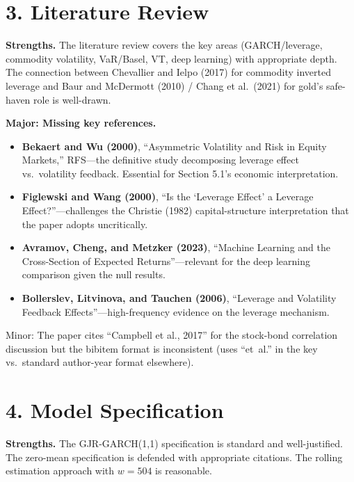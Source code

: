 \documentclass[12pt,a4paper]{article}
\begin{document}
\bigskip

\section*{3. Literature Review}

\textcolor{okgreen}{\textbf{Strengths.}} The literature review covers the key areas (GARCH/leverage, commodity volatility, VaR/Basel, VT, deep learning) with appropriate depth. The connection between Chevallier and Ielpo (2017) for commodity inverted leverage and Baur and McDermott (2010) / Chang et al.\ (2021) for gold's safe-haven role is well-drawn.

\textcolor{warncolor}{\textbf{Major: Missing key references.}}
\begin{itemize}[nosep]
\item \textbf{Bekaert and Wu (2000)}, ``Asymmetric Volatility and Risk in Equity Markets,'' RFS---the definitive study decomposing leverage effect vs.\ volatility feedback. Essential for Section 5.1's economic interpretation.
\item \textbf{Figlewski and Wang (2000)}, ``Is the `Leverage Effect' a Leverage Effect?''---challenges the Christie (1982) capital-structure interpretation that the paper adopts uncritically.
\item \textbf{Avramov, Cheng, and Metzker (2023)}, ``Machine Learning and the Cross-Section of Expected Returns''---relevant for the deep learning comparison given the null results.
\item \textbf{Bollerslev, Litvinova, and Tauchen (2006)}, ``Leverage and Volatility Feedback Effects''---high-frequency evidence on the leverage mechanism.
\end{itemize}

Minor: The paper cites ``Campbell et al., 2017'' for the stock-bond correlation discussion but the bibitem format is inconsistent (uses ``et~al.'' in the key vs.\ standard author-year format elsewhere).

\bigskip

\section*{4. Model Specification}

\textcolor{okgreen}{\textbf{Strengths.}} The GJR-GARCH(1,1) specification is standard and well-justified. The zero-mean specification is defended with appropriate citations. The rolling estimation approach with $w = 504$ is reasonable.
\end{document}
